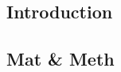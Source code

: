 \hypertarget{introduction}{%
\subsection{Introduction}\label{introduction}}

\hypertarget{mat-meth}{%
\subsection{Mat \& Meth}\label{mat-meth}}
